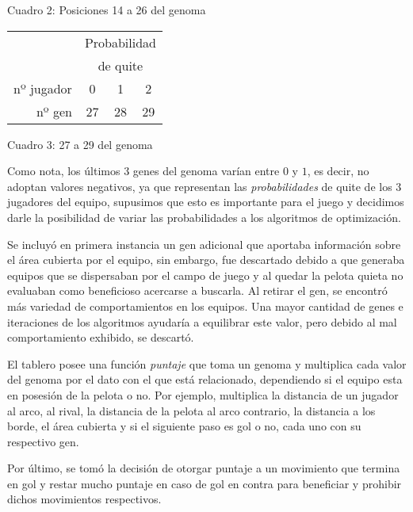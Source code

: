 \vskip 1mm
\begin{center}
{Cuadro 2: Posiciones 14 a 26 del genoma}
\end{center}

\begin{tabular}{r|ccc|}
\cline{2-4}
 & \multicolumn{3}{c|}{Probabilidad} \\
 & \multicolumn{3}{c|}{de quite} \\ \hline
\multicolumn{1}{|r|}{nº jugador} & 0 & 1 & 2 \\ \hline
\multicolumn{1}{|r|}{nº gen} & 27 & 28 & 29 \\ \hline
\end{tabular}

\vskip 1mm
\begin{center}
{Cuadro 3: 27 a 29 del genoma}
\end{center}

Como nota, los últimos 3 genes del genoma varían entre $0$ y $1$, es decir, no
adoptan valores negativos, ya que representan las {\it probabilidades\/} de
quite de los 3 jugadores del equipo, supusimos que esto es importante para el
juego y decidimos darle la posibilidad de variar las probabilidades a los
algoritmos de optimización.

Se incluyó en primera instancia un gen adicional que aportaba información sobre
el área cubierta por el equipo, sin embargo,  fue descartado debido a que
generaba equipos que se dispersaban por el campo de juego y al quedar la pelota
quieta no evaluaban como beneficioso acercarse a buscarla. Al retirar el gen,
se encontró más variedad de comportamientos en los equipos. Una mayor cantidad de
genes e iteraciones de los algoritmos ayudaría a equilibrar este valor, pero
debido al mal comportamiento exhibido, se descartó. 

El tablero posee una función {\it puntaje\/} que toma un genoma y
multiplica cada valor del genoma por el dato con el que está relacionado,
dependiendo si el equipo esta en posesión de la pelota o no. Por ejemplo,
multiplica la distancia de un jugador al arco, al rival, la distancia de la
pelota al arco contrario, la distancia a los borde, el área cubierta y si el
siguiente paso es gol o no, cada uno con su respectivo gen.




Por último, se tomó la decisión de otorgar puntaje a un movimiento que termina
en gol y restar mucho puntaje en caso de gol en contra para beneficiar y
prohibir dichos movimientos respectivos.
